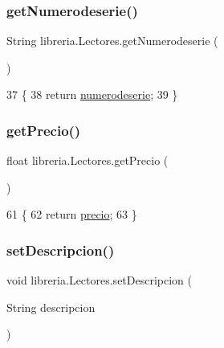 \subsubsection{\texorpdfstring{get\+Numerodeserie()}{getNumerodeserie()}}
{\footnotesize\ttfamily String libreria.\+Lectores.\+get\+Numerodeserie (\begin{DoxyParamCaption}{ }\end{DoxyParamCaption})\hspace{0.3cm}{\ttfamily [inline]}}


\begin{DoxyCode}
37                                      \{
38         \textcolor{keywordflow}{return} \mbox{\hyperlink{classlibreria_1_1_lectores_acfa30a33712a3e927a4157c46e22dfd2}{numerodeserie}};
39     \}
\end{DoxyCode}
\mbox{\label{classlibreria_1_1_lectores_a99c74a428e00256c4cb3f3c19dd2f048}} 
\subsubsection{\texorpdfstring{get\+Precio()}{getPrecio()}}
{\footnotesize\ttfamily float libreria.\+Lectores.\+get\+Precio (\begin{DoxyParamCaption}{ }\end{DoxyParamCaption})\hspace{0.3cm}{\ttfamily [inline]}}


\begin{DoxyCode}
61                              \{
62         \textcolor{keywordflow}{return} \mbox{\hyperlink{classlibreria_1_1_lectores_ae03623755bede2e0f37e40f2cea3fa2f}{precio}};
63     \}
\end{DoxyCode}
\mbox{\label{classlibreria_1_1_lectores_ae66a09335142d5563e501e05c5f2b15f}} 
\subsubsection{\texorpdfstring{set\+Descripcion()}{setDescripcion()}}
{\footnotesize\ttfamily void libreria.\+Lectores.\+set\+Descripcion (\begin{DoxyParamCaption}\item[{String}]{descripcion }\end{DoxyParamCaption})\hspace{0.3cm}{\ttfamily [inline]}}


